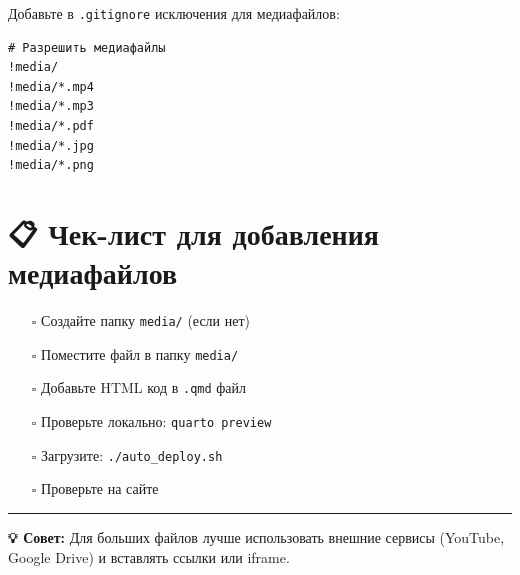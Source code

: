 \documentclass[
  russian,
  12pt,
  a4paper,
]{article}
\providecommand{\tightlist}{%
  \setlength{\itemsep}{0pt}\setlength{\parskip}{0pt}}
\begin{document}
Добавьте в \texttt{.gitignore} исключения для медиафайлов:

\begin{verbatim}
# Разрешить медиафайлы
!media/
!media/*.mp4
!media/*.mp3
!media/*.pdf
!media/*.jpg
!media/*.png
\end{verbatim}

\section{📋 Чек-лист для добавления
медиафайлов}\label{ux447ux435ux43a-ux43bux438ux441ux442-ux434ux43bux44f-ux434ux43eux431ux430ux432ux43bux435ux43dux438ux44f-ux43cux435ux434ux438ux430ux444ux430ux439ux43bux43eux432}

\begin{itemize}
\tightlist
\item[$\square$]
  Создайте папку \texttt{media/} (если нет)
\item[$\square$]
  Поместите файл в папку \texttt{media/}
\item[$\square$]
  Добавьте HTML код в \texttt{.qmd} файл
\item[$\square$]
  Проверьте локально: \texttt{quarto\ preview}
\item[$\square$]
  Загрузите: \texttt{./auto\_deploy.sh}
\item[$\square$]
  Проверьте на сайте
\end{itemize}

\begin{center}\rule{0.5\linewidth}{0.5pt}\end{center}

\textbf{💡 Совет:} Для больших файлов лучше использовать внешние сервисы
(YouTube, Google Drive) и вставлять ссылки или iframe.
\end{document}
